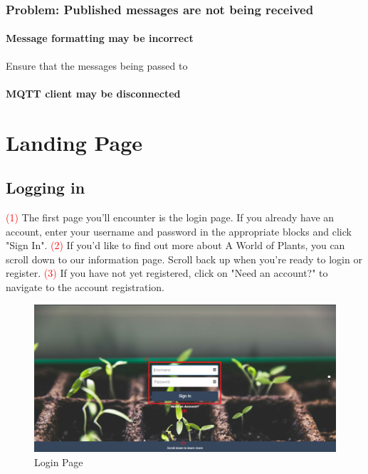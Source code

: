 \documentclass{article}
\begin{document}
		\subsubsection{Problem: Published messages are not being received}
			\paragraph{Message formatting may be incorrect}
				Ensure that the messages being passed to 
			\paragraph{MQTT client may be disconnected}
				
		
\section{Landing Page}
	\subsection{Logging in}
		\textcolor{red}{(1)} The first page you'll encounter is the login page. If you already have an account, enter your username and password in the appropriate blocks and click "Sign In".
		\newline
		\textcolor{red}{(2)} If you'd like to find out more about A World of Plants, you can scroll down to our information page. Scroll back up when you're ready to login or register.
		\newline
		\textcolor{red}{(3)} If you have not yet registered, click on "Need an account?" to navigate to the account registration.
		\begin{figure}[H]
			\includegraphics[width=\textwidth]{../images/UserManual/login.PNG}
			\caption{Login Page}
		\end{figure}				
		
\end{document}
